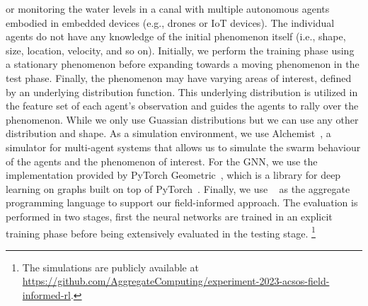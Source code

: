  or monitoring the water levels in a canal with multiple autonomous agents embodied in embedded devices (e.g., drones or IoT devices). The individual agents do not have any knowledge of the initial phenomenon itself (i.e., shape, size, location, velocity, and so on).
Initially, 
  we perform the training phase using a stationary phenomenon before expanding towards a moving phenomenon in the test phase. 
  Finally, the phenomenon may have varying areas of interest, defined by an underlying distribution function. This underlying distribution is utilized in the feature set of each agent's observation and guides the agents to rally over the phenomenon. While we only use Guassian distributions but we can use any other distribution and shape. 
As a simulation environment, we use Alchemist~\cite{alchemist}, 
 a simulator for multi-agent systems that allows us to simulate the swarm behaviour of the agents 
 and the phenomenon of interest.
For the \ac{GNN}, we use the implementation provided by PyTorch Geometric~\cite{Fey/Lenssen/2019}, 
 which is a library for deep learning on graphs built on top of PyTorch~\cite{torch}.
Finally, we use \scafi{}~\cite{casadei2022scafi} as the aggregate programming language to support our field-informed approach.
The evaluation is performed in two stages, first the neural networks are trained in an explicit training phase before being extensively evaluated in the testing stage.
\footnote{The simulations are publicly available at \url{https://github.com/AggregateComputing/experiment-2023-acsos-field-informed-rl}.}
